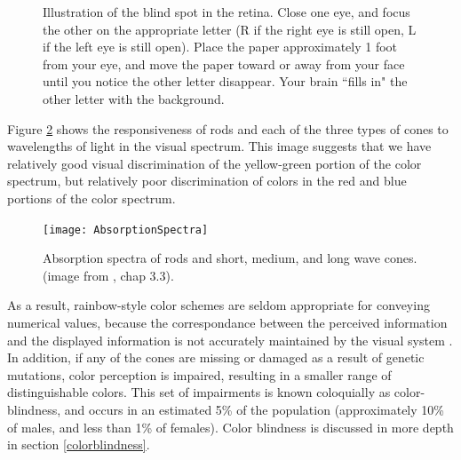 \documentclass[11pt]{isuthesis}\usepackage[]{graphicx}\usepackage[]{color}
\begin{document}
\begin{figure}[htbp]\centering
\begin{center}
\end{center}
\caption[Blind Spot]{Illustration of the blind spot in the retina. Close one eye, and focus the other on the appropriate letter (R if the right eye is still open, L if the left eye is still open). Place the paper approximately 1 foot from your eye, and move the paper toward or away from your face until you notice the other letter disappear. Your brain ``fills in" the other letter with the background.}\label{fig:blindspot}
\end{figure}

Figure \ref{fig:ColorRange} shows the responsiveness of rods and each of the three types of cones to wavelengths of light in the visual spectrum. This image suggests that we have relatively good visual discrimination of the yellow-green portion of the color spectrum, but relatively poor discrimination of colors in the red and blue portions of the color spectrum. 

\begin{figure}[htbp]\centering
\texttt{[image: AbsorptionSpectra]}
\caption[Absorption spectra of retinal cells]{Absorption spectra of rods and short, medium, and long wave cones. (image from \protect\citealt{goldstein}, chap 3.3).} \label{fig:ColorRange}
\end{figure}

As a result, rainbow-style color schemes are seldom appropriate for conveying numerical values, because the correspondance between the perceived information and the displayed information is not accurately maintained by the visual system \citep{rainbowcolor}. In addition, if any of the cones are missing or damaged as a result of genetic mutations, color perception is impaired, resulting in a smaller range of distinguishable colors. This set of impairments is known coloquially as color-blindness, and occurs in an estimated 5\% of the population (approximately 10\% of males, and less than 1\% of females). Color blindness is discussed in more depth in section \ref{colorblindness}. 
\end{document}

